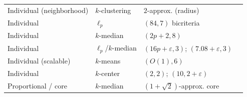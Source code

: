 \begin{table}[t]
\begin{tabular}{@{}p{3.5cm}p{2.2cm}p{4.6cm}l@{}}
Individual (neighborhood) & $k$-clustering & $2$-approx. (radius) & \citep{JungKL20}\\
Individual & $\ell_p$ & $(84,7)$ bicriteria & \citep{MahabadiV20}\\
Individual & $k$-median & $(2p{+}2,8)$ & \citep{ChakrabartyN21}\\
Individual & $\ell_p$/$k$-median & $(16p{+}\varepsilon,3)$; $(7.08{+}\varepsilon,3)$ & \citep{VakilianY22}\\
Individual (scalable) & $k$-means & $(O(1),6)$ & \citep{bateni2024scalable}\\
Individual & $k$-center & $(2,2)$; $(10,2{+}\varepsilon)$ & \citep{ebbens2024subquadratic}\\
Proportional / core & $k$-median & $(1{+}\sqrt{2})$-approx. core & \citep{chen2019proportionally}\\
\bottomrule
\end{tabular}
\end{table}
